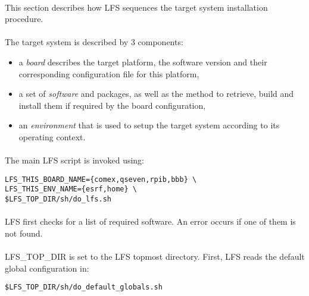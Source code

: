 \documentclass[a4paper, 11pt]{article}
\begin{document}
\paragraph{}
This section describes how LFS sequences the target system installation procedure.

\paragraph{}
The target system is described by 3 components:
\begin{itemize}
\item a \textit{board} describes the target platform, the software version and
their corresponding configuration file for this platform,
\item a set of \textit{software} and packages, as well as the method to retrieve,
build and install them if required by the board configuration,
\item an \textit{environment} that is used to setup the target system according
to its operating context.
\end{itemize}

\paragraph{}
The main LFS script is invoked using:\\

\begin{lstlisting}[frame=tb]
LFS_THIS_BOARD_NAME={comex,qseven,rpib,bbb} \
LFS_THIS_ENV_NAME={esrf,home} \
$LFS_TOP_DIR/sh/do_lfs.sh
\end{lstlisting}

\paragraph{}
LFS first checks for a list of required software. An error occurs if one of them
is not found.

\paragraph{}
LFS\_TOP\_DIR is set to the LFS topmost directory. First, LFS reads the default
global configuration in:\\

\begin{lstlisting}[frame=tb]
$LFS_TOP_DIR/sh/do_default_globals.sh
\end{lstlisting}
\end{document}
